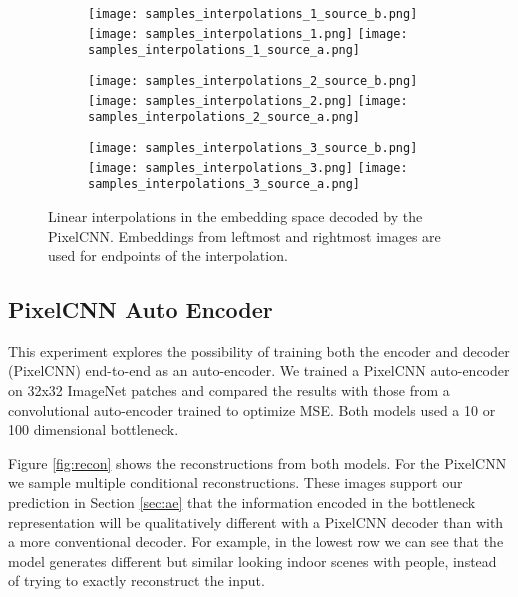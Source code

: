 \documentclass{article}
\begin{document}
\begin{figure*}[p]

\begin{subfigure}{0.98\textwidth}
  \centering
  \hfill
  \texttt{[image: samples\_interpolations\_1\_source\_b.png]}
  \hfill
  \texttt{[image: samples\_interpolations\_1.png]}
  \hfill
  \texttt{[image: samples\_interpolations\_1\_source\_a.png]}
  \hfill
\end{subfigure}

\begin{subfigure}{0.98\textwidth}
  \centering
  \hfill
  \texttt{[image: samples\_interpolations\_2\_source\_b.png]}
  \hfill
  \texttt{[image: samples\_interpolations\_2.png]}
  \hfill
  \texttt{[image: samples\_interpolations\_2\_source\_a.png]}
  \hfill
\end{subfigure}

\begin{subfigure}{0.98\textwidth}
  \centering
  \hfill
  \texttt{[image: samples\_interpolations\_3\_source\_b.png]}
  \hfill
  \texttt{[image: samples\_interpolations\_3.png]}
  \hfill
  \texttt{[image: samples\_interpolations\_3\_source\_a.png]}
  \hfill
\end{subfigure}

\caption{Linear interpolations in the embedding space decoded by the PixelCNN. Embeddings from leftmost and rightmost images are used for endpoints of the interpolation.}
\label{fig:transitions}

\end{figure*}


\subsection{PixelCNN Auto Encoder}

This experiment explores the possibility of training both the encoder and decoder (PixelCNN) end-to-end as an auto-encoder. We trained a PixelCNN auto-encoder on 32x32 ImageNet patches and compared the results with those from a convolutional auto-encoder trained to optimize MSE. Both models used a 10 or 100 dimensional bottleneck. 

Figure \ref{fig:recon} shows the reconstructions from both models. For the PixelCNN we sample multiple conditional reconstructions. 
These images support our prediction in Section \ref{sec:ae} that the information encoded in the bottleneck representation  will be qualitatively different with a PixelCNN decoder than with a more conventional decoder.
For example, in the lowest row we can see that the model generates different but similar looking indoor scenes with people, instead of trying to exactly reconstruct the input.
\end{document}
